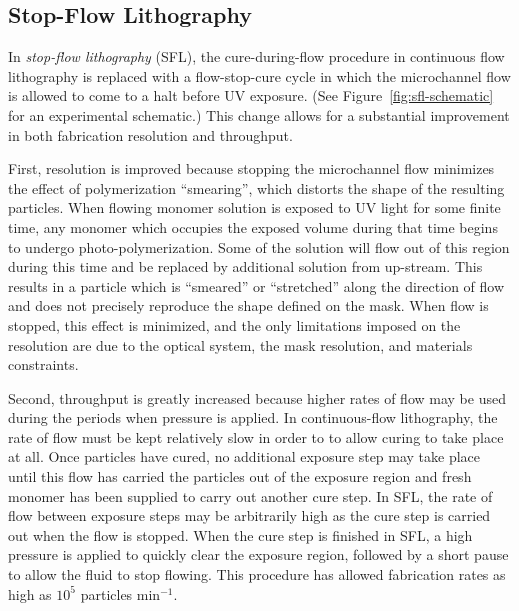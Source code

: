 \subsection{Stop-Flow Lithography}
\label{sec:SFL}


In \textit{stop-flow lithography} (SFL), the cure-during-flow
procedure in continuous flow lithography is replaced with a flow-stop-cure cycle in which the microchannel flow
is allowed to come to a halt before UV exposure. (See Figure~\ref{fig:sfl-schematic} for an experimental
schematic.) This change allows for a substantial improvement in both 
fabrication resolution and throughput.~\cite{dendukuri-sfl}

First, resolution is improved because stopping the microchannel flow minimizes the effect of polymerization
``smearing'', which distorts the shape of the resulting particles.
When flowing monomer solution is exposed to UV light for some finite time, any monomer which occupies the exposed volume 
during that time begins to undergo photo-polymerization.  Some of the solution will flow out of this region 
during this time and be replaced by additional solution from up-stream. This results in a particle which is ``smeared''
or ``stretched'' along the direction of flow and does not precisely reproduce the shape defined on the mask.  
When flow is 
stopped, this effect is minimized, and the only limitations imposed on the resolution are due to the optical system,
the mask resolution, and materials constraints.

Second, throughput is greatly increased because higher rates of flow may be used during the periods when pressure is
applied.  In continuous-flow lithography, the rate of flow must be kept relatively slow 
in order to to allow curing to take place
at all.
Once particles have cured, no 
additional exposure step may take place until this flow has carried the particles out of the
exposure region and fresh monomer has been supplied to carry out another cure step.  In SFL, the rate of flow
between exposure steps
may be arbitrarily high as the cure step is carried out when the flow is stopped. 
When the cure step is finished in SFL, a high pressure is applied to quickly clear the exposure region, followed by a 
short pause to allow the fluid to stop flowing.  This procedure has allowed fabrication rates as high as 
$10^5$ particles min$^{-1}$.~\cite{dendukuri-sfl}

